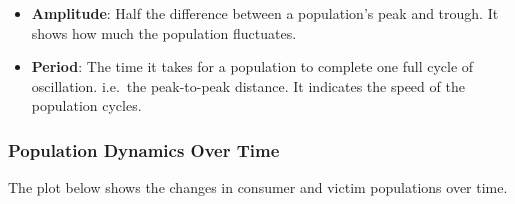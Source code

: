 \documentclass[
  a4paper]{book}
\providecommand{\tightlist}{%
  \setlength{\itemsep}{0pt}\setlength{\parskip}{0pt}}
\begin{document}
\begin{itemize}
\tightlist
\item
  \textbf{Amplitude}: Half the difference between a population's peak and trough. It shows how much the population fluctuates.
\item
  \textbf{Period}: The time it takes for a population to complete one full cycle of oscillation. i.e.~the peak-to-peak distance. It indicates the speed of the population cycles.
\end{itemize}

\subsubsection{Population Dynamics Over Time}\label{population-dynamics-over-time}

The plot below shows the changes in consumer and victim populations over time.
\end{document}
